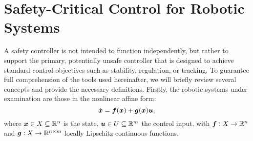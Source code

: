 




\section{Safety-Critical Control for Robotic Systems}
A safety controller is not intended to function independently, but rather to support the primary, potentially unsafe controller that is designed to achieve standard control objectives such as stability, regulation, or tracking. To guarantee full comprehension of the tools used hereinafter, we will briefly review several concepts and provide the necessary definitions. 
Firstly, the robotic systems under examination are those in the nonlinear affine form:
\begin{equation}
    \dot{\boldsymbol{x}}=\boldsymbol{f}(\boldsymbol{x})+\boldsymbol{g}(\boldsymbol{x})\boldsymbol{u},
    \label{eq:system}
\end{equation}
where $\boldsymbol{x}\in X\subseteq \mathbb{R}^n$ is the state, $\boldsymbol{u}\in U \subseteq \mathbb{R}^m$ the control input, with $\boldsymbol{f} : X\to\mathbb{R}^n$ and $\boldsymbol{g} : X\to\mathbb{R}^{n\times m} $ locally Lipschitz continuous functions. 
